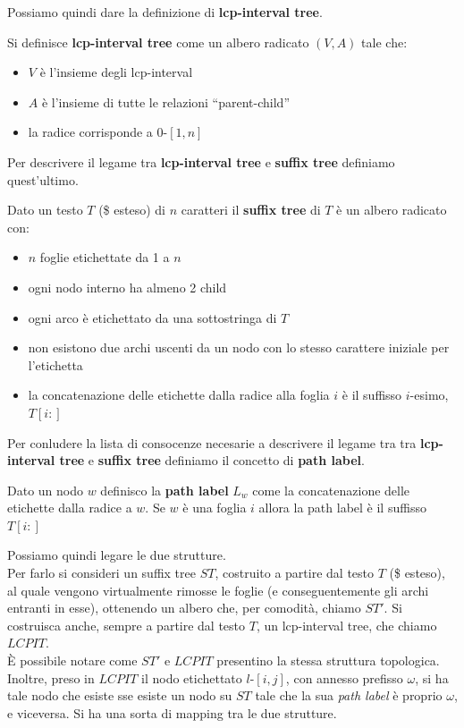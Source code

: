 \documentclass[a4paper,12pt, oneside]{book}
\begin{document}
Possiamo quindi dare la definizione di \textbf{lcp-interval tree}.
\begin{definizione}
  Si definisce \textbf{lcp-interval tree} come un albero radicato $(V,A)$ tale
  che: 
  \begin{itemize}
    \item $V$ è l'insieme degli lcp-interval
    \item $A$ è l'insieme di tutte le relazioni ``parent-child''
    \item la radice corrisponde a $0$-$[1,n]$
  \end{itemize}
\end{definizione}
Per descrivere il legame tra \textbf{lcp-interval tree} e \textbf{suffix tree} 
definiamo quest'ultimo.
\begin{definizione}
  Dato un testo $T$ (\$ esteso) di $n$ caratteri il \textbf{suffix tree} di $T$
  è un albero radicato con: 
  \begin{itemize}
    \item $n$ foglie etichettate da 1 a $n$
    \item ogni nodo interno ha almeno 2 child
    \item ogni arco è etichettato da una sottostringa di $T$
    \item non esistono due archi uscenti da un nodo con lo stesso carattere
    iniziale per l'etichetta
    \item la concatenazione delle etichette dalla radice alla foglia $i$
    è il suffisso $i$-esimo, $T[i:]$ 
  \end{itemize}
\end{definizione}
\noindent
Per conludere la lista di consocenze necesarie a descrivere il legame tra  tra
\textbf{lcp-interval tree} e \textbf{suffix tree} definiamo il concetto di
\textbf{path label}. 
\begin{definizione}
  Dato un nodo $w$ definisco la \textbf{path label} $L_w$ come la concatenazione
  delle etichette dalla radice a $w$. Se $w$ è una foglia $i$ allora la path
  label è il suffisso $T[i:]$
\end{definizione}
\noindent
Possiamo quindi legare le due strutture.\\
Per farlo si consideri un suffix tree $ST$, costruito a partire dal testo $T$
(\$ esteso),
al quale vengono virtualmente rimosse le foglie (e conseguentemente gli archi
entranti in esse), ottenendo un albero che, per comodità, chiamo $ST'$. 
Si costruisca anche, sempre a partire dal testo $T$, un lcp-interval tree, che
chiamo $LCPIT$.\\
È possibile notare come $ST'$ e $LCPIT$ presentino la stessa struttura
topologica. Inoltre, preso in $LCPIT$ il nodo etichettato $l\mbox{-}[i,j]$, con
annesso prefisso $\omega$, si ha tale nodo che esiste sse esiste un nodo su $ST$
tale che la sua \textit{path label} è proprio $\omega$, e viceversa. 
Si ha una sorta di mapping tra le due strutture.
\end{document}
